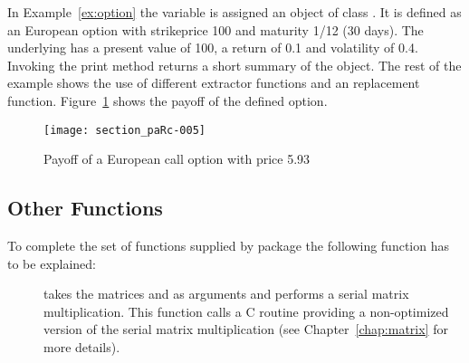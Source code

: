 In Example~\ref{ex:option} the variable  is assigned an
object of class . It is defined as an European option
with strikeprice 100 and maturity 1/12 (30 days). The underlying has a
present value of 100, a return of 0.1 and volatility of 0.4. Invoking the print
method returns a short summary of the object. The rest
of the example shows the use of different extractor functions and an
replacement function. Figure~\ref{fig:payoff} shows the payoff of the
defined option.

\begin{figure}[t]
\centering
\texttt{[image: section\_paRc-005]}
\label{fig:payoff} 
\caption{Payoff of a European call option with price 5.93}
\end{figure}

\subsection{Other Functions}

To complete the set of functions supplied by package  the
following function has to be explained:

\begin{description}
\item[] takes the matrices  and
   as arguments and performs a serial matrix
  multiplication. This function calls a C routine providing a
  non-optimized version of the serial matrix multiplication (see
  Chapter~\ref{chap:matrix} for more details).  
\end{description}
